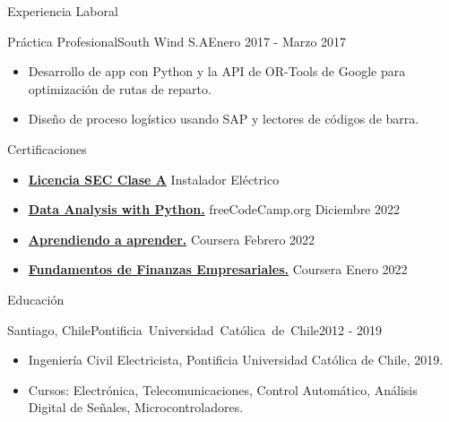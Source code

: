 \documentclass[]{mcdowellcv}
\begin{document}
\begin{cvsection}{Experiencia Laboral}
		\begin{cvsubsection}{Práctica Profesional}{South Wind S.A}{Enero 2017 - Marzo 2017}		
			\begin{itemize}
				\item Desarrollo de app con Python y la API de OR-Tools de Google para optimización de rutas de reparto.
				\item Diseño de proceso logístico usando SAP y lectores de códigos de barra.
			\end{itemize}
		\end{cvsubsection}
		
	\end{cvsection}

	\begin{cvsection}{Certificaciones}
		\begin{cvsubsection}{}{ }{}
			\begin{itemize}
				\item \textbf{\href{https://wlhttp.sec.cl/rnii/public/licencia/qr?o=f5fadb9edfac5b9324c6db95b80eebbe}{Licencia SEC Clase A}} Instalador Eléctrico
				\item \textbf{\href{https://www.freecodecamp.org/certification/fcc97b8767b-5a07-4487-b743-fd7d5742d505/data-analysis-with-python-v7}{Data Analysis with Python.}} freeCodeCamp.org Diciembre 2022
				\item \textbf{\href{https://www.coursera.org/learn/aprendiendo-a-aprender}{Aprendiendo a aprender.}} Coursera Febrero 2022
				\item \textbf{\href{https://www.coursera.org/learn/finanzas-empresariales}{Fundamentos de Finanzas Empresariales.}} Coursera Enero 2022
			\end{itemize}
		\end{cvsubsection}
	\end{cvsection}
	
	\begin{cvsection}{Educación}
		\begin{cvsubsection}{Santiago, Chile}{\mbox{Pontificia Universidad Católica de Chile}}{2012 - 2019}
			\begin{itemize}
				\item Ingeniería Civil Electricista, Pontificia Universidad Católica de Chile, 2019.
				\item Cursos: Electrónica, Telecomunicaciones, Control Automático, Análisis Digital de Señales, Microcontroladores.
				\end{itemize}
		\end{cvsubsection}
	\end{cvsection}
	
\end{document}
